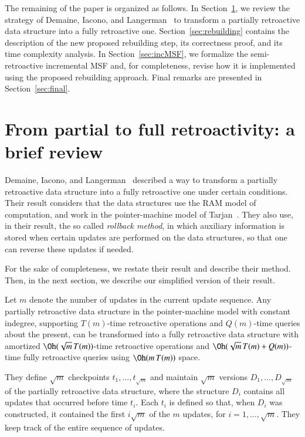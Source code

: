 \documentclass[3p,times,procedia]{elsarticle}
\begin{document}
The remaining of the paper is organized as follows. 
In Section~\ref{sec:review}, we review the strategy of Demaine, Iacono, and 
Langerman~\cite{DemaineIL2007} to transform a partially retroactive data structure 
into a fully retroactive one.
Section~\ref{sec:rebuilding} contains the description of the new proposed rebuilding step, 
its correctness proof, and its time complexity analysis. 
In Section~\ref{sec:incMSF}, we formalize the semi-retroactive incremental MSF
and, for completeness, revise how it is implemented using the proposed rebuilding approach. 
Final remarks are presented in Section~\ref{sec:final}.

\section{From partial to full retroactivity: a brief review}\label{sec:review}

Demaine, Iacono, and Langerman~\cite{DemaineIL2007} described a way to transform 
a partially retroactive data structure into a fully retroactive one under certain conditions.
Their result considers that the data structures use the RAM model of computation, 
and work in the pointer-machine model of Tarjan~\cite{Tarjan1979}.
They also use, in their result, the so called \emph{rollback method}, in which 
auxiliary information is stored when certain updates are performed on the data
structures, so that one can reverse these updates if needed.

For the sake of completeness, we restate their result and describe their method. 
Then, in the next section, we describe our simplified version of their result. 

\begin{theorem}
  Let $m$ denote the number of updates in the current update sequence. 
  Any partially retroactive data structure in the pointer-machine model with 
  constant indegree, supporting $T(m)$-time retroactive operations and $Q(m)$-time
  queries about the present, can be transformed into a fully retroactive data
  structure with amortized $\Oh(\sqrt{m}\,T(m))$-time retroactive operations and 
  $\Oh(\sqrt{m}\,T(m)+Q(m))$-time fully retroactive queries using $\Oh(m\,T(m))$ space.
\end{theorem}

They define $\sqrt{m}$ checkpoints $t_1,\ldots,t_{\sqrt{m}}$ and maintain $\sqrt{m}$ 
versions $D_1,\ldots,D_{\sqrt{m}}$ of the partially retroactive data structure, 
where the structure $D_i$ contains all updates that occurred before time $t_i$.
Each $t_i$ is defined so that, when $D_i$ was constructed, it contained 
the first $i\sqrt{m}$ of the $m$ updates, for $i=1,\ldots,\sqrt{m}$. 
They keep track of the entire sequence of updates.
\end{document}
